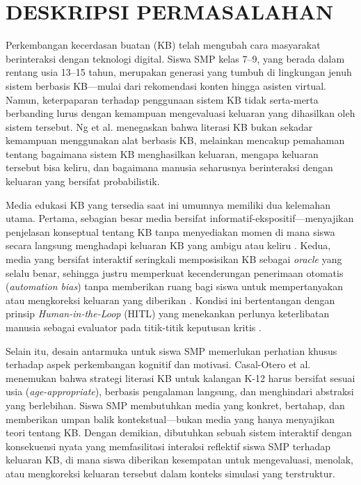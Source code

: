 \documentclass[12pt,a4paper,oneside,openany]{report}
\begin{document}
\section{DESKRIPSI PERMASALAHAN}
\label{sec:deskripsi-permasalahan}

Perkembangan kecerdasan buatan (KB) telah mengubah cara masyarakat berinteraksi dengan teknologi digital. Siswa SMP kelas 7--9, yang berada dalam rentang usia 13--15 tahun, merupakan generasi yang tumbuh di lingkungan jenuh sistem berbasis KB---mulai dari rekomendasi konten hingga asisten virtual. Namun, keterpaparan terhadap penggunaan sistem KB tidak serta-merta berbanding lurus dengan kemampuan mengevaluasi keluaran yang dihasilkan oleh sistem tersebut. Ng et al. \cite{ref1} menegaskan bahwa literasi KB bukan sekadar kemampuan menggunakan alat berbasis KB, melainkan mencakup pemahaman tentang bagaimana sistem KB menghasilkan keluaran, mengapa keluaran tersebut bisa keliru, dan bagaimana manusia seharusnya berinteraksi dengan keluaran yang bersifat probabilistik.

Media edukasi KB yang tersedia saat ini umumnya memiliki dua kelemahan utama. Pertama, sebagian besar media bersifat informatif-ekspositif---menyajikan penjelasan konseptual tentang KB tanpa menyediakan momen di mana siswa secara langsung menghadapi keluaran KB yang ambigu atau keliru \cite{ref2}. Kedua, media yang bersifat interaktif seringkali memposisikan KB sebagai \textit{oracle} yang selalu benar, sehingga justru memperkuat kecenderungan penerimaan otomatis (\textit{automation bias}) tanpa memberikan ruang bagi siswa untuk mempertanyakan atau mengkoreksi keluaran yang diberikan \cite{ref4}\cite{ref5}. Kondisi ini bertentangan dengan prinsip \textit{Human-in-the-Loop} (HITL) yang menekankan perlunya keterlibatan manusia sebagai evaluator pada titik-titik keputusan kritis \cite{ref4}.

Selain itu, desain antarmuka untuk siswa SMP memerlukan perhatian khusus terhadap aspek perkembangan kognitif dan motivasi. Casal-Otero et al. \cite{ref2} menemukan bahwa strategi literasi KB untuk kalangan K-12 harus bersifat sesuai usia (\textit{age-appropriate}), berbasis pengalaman langsung, dan menghindari abstraksi yang berlebihan. Siswa SMP membutuhkan media yang konkret, bertahap, dan memberikan umpan balik kontekstual---bukan media yang hanya menyajikan teori tentang KB. Dengan demikian, dibutuhkan sebuah sistem interaktif dengan konsekuensi nyata yang memfasilitasi interaksi reflektif siswa SMP terhadap keluaran KB, di mana siswa diberikan kesempatan untuk mengevaluasi, menolak, atau mengkoreksi keluaran tersebut dalam konteks simulasi yang terstruktur.
\end{document}

